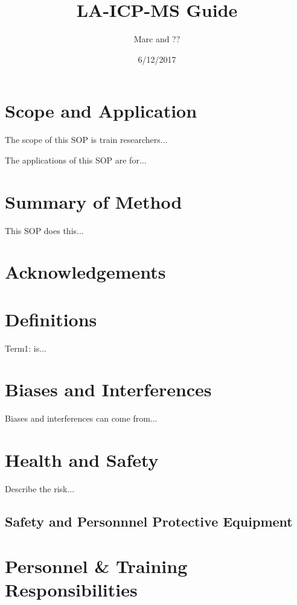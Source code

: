 \documentclass[12pt]{../SOP3_beta}
\title{LA-ICP-MS Guide}
\date{6/12/2017}
\author{Marc and ??}
\begin{document}


\maketitle

\section{Scope and Application}

\NP The scope of this SOP is train researchers...

\NP The applications of this SOP are for...

\section{Summary of Method}

\NP This SOP does this...

\tableofcontents

\newpage

\section{Acknowledgements}

\section{Definitions}

\NP Term1: is...

\section{Biases and Interferences}

\NP Biases and interferences can come from...

\section{Health and Safety}

\NP Describe the risk...


\subsection{Safety and Personnnel Protective Equipment}


\section{Personnel \& Training Responsibilities}
\end{document}
